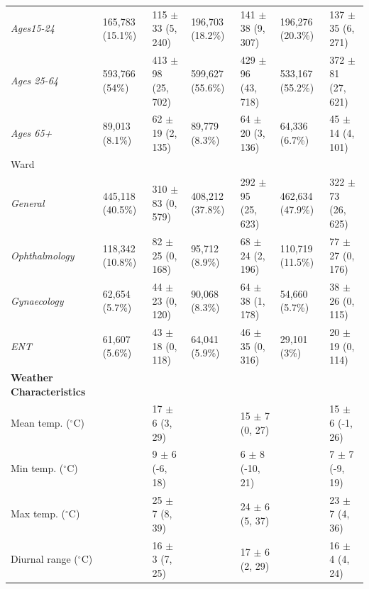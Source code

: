 \begin{longtable}[t]{lllllll}
\hspace{2em}\textit{Ages15-24} & 165,783 (15.1\%) & 115 $\pm$ 33 (5, 240) & 196,703 (18.2\%) & 141 $\pm$ 38 (9, 307) & 196,276 (20.3\%) & 137 $\pm$ 35 (6, 271)\\
\hspace{2em}\textit{Ages 25-64} & 593,766 (54\%) & 413 $\pm$ 98 (25, 702) & 599,627 (55.6\%) & 429 $\pm$ 96 (43, 718) & 533,167 (55.2\%) & 372 $\pm$ 81 (27, 621)\\
\hspace{2em}\textit{Ages 65+} & 89,013 (8.1\%) & 62 $\pm$ 19 (2, 135) & 89,779 (8.3\%) & 64 $\pm$ 20 (3, 136) & 64,336 (6.7\%) & 45 $\pm$ 14 (4, 101)\\
\hspace{1em}Ward &  &  &  &  &  & \\
\hspace{2em}\textit{General} & 445,118 (40.5\%) & 310 $\pm$ 83 (0, 579) & 408,212 (37.8\%) & 292 $\pm$ 95 (25, 623) & 462,634 (47.9\%) & 322 $\pm$ 73 (26, 625)\\
\hspace{2em}\textit{Ophthalmology} & 118,342 (10.8\%) & 82 $\pm$ 25 (0, 168) & 95,712 (8.9\%) & 68 $\pm$ 24 (2, 196) & 110,719 (11.5\%) & 77 $\pm$ 27 (0, 176)\\
\hspace{2em}\textit{Gynaecology} & 62,654 (5.7\%) & 44 $\pm$ 23 (0, 120) & 90,068 (8.3\%) & 64 $\pm$ 38 (1, 178) & 54,660 (5.7\%) & 38 $\pm$ 26 (0, 115)\\
\hspace{2em}\textit{ENT} & 61,607 (5.6\%) & 43 $\pm$ 18 (0, 118) & 64,041 (5.9\%) & 46 $\pm$ 35 (0, 316) & 29,101 (3\%) & 20 $\pm$ 19 (0, 114)\\
\textbf{Weather Characteristics} &  &  &  &  &  & \\
\hspace{1em}Mean temp. ($^\circ$C) &  & 17 $\pm$ 6 (3, 29) &  & 15 $\pm$ 7 (0, 27) &  & 15 $\pm$ 6 (-1, 26)\\
\hspace{1em}Min temp. ($^\circ$C) &  & 9 $\pm$ 6 (-6, 18) &  & 6 $\pm$ 8 (-10, 21) &  & 7 $\pm$ 7 (-9, 19)\\
\hspace{1em}Max temp. ($^\circ$C) &  & 25 $\pm$ 7 (8, 39) &  & 24 $\pm$ 6 (5, 37) &  & 23 $\pm$ 7 (4, 36)\\
\hspace{1em}Diurnal range ($^\circ$C) &  & 16 $\pm$ 3 (7, 25) &  & 17 $\pm$ 6 (2, 29) &  & 16 $\pm$ 4 (4, 24)\\

\end{longtable}
